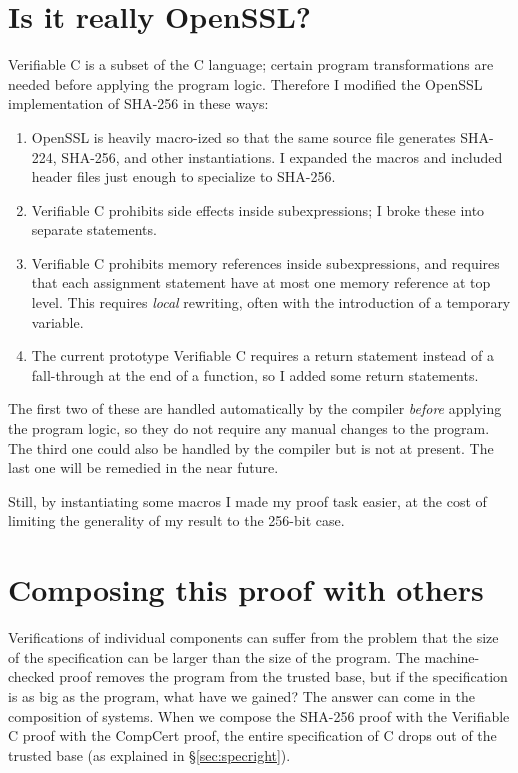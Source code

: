 \documentclass[prodmode,acmtoplas]{acmsmall}
\begin{document}
\section{Is it really OpenSSL?}
\label{sec:changes}
Verifiable C is a subset of the C language;
certain program transformations are needed before
applying the program logic.  Therefore I modified the
OpenSSL implementation of SHA-256 in these ways:

\begin{enumerate}
\item OpenSSL is heavily macro-ized so that the same
source file generates SHA-224, SHA-256, and other
instantiations.  I expanded the macros and included header
files just enough to specialize to SHA-256.
\item Verifiable C prohibits side effects inside subexpressions;
I broke these into separate statements.
\item Verifiable C
prohibits memory references inside subexpressions,
and
requires that each assignment statement have at most one memory reference
at top level.  This requires \emph{local} rewriting, often with
the introduction of a temporary variable.
\item The current prototype Verifiable C requires a return statement instead
of a fall-through at the end of a function, so I added some return statements.
\end{enumerate}
The first two of these are handled automatically by the compiler
\emph{before} applying the program logic, so they do not require
any manual changes to the program.  The third one could
also be handled by the compiler but is not at present.
The last one will be remedied in the near future.

Still, by instantiating some macros I made my proof task easier,
at the cost of limiting the generality of my result to the 256-bit case.

\section{Composing this proof with others}
\label{context}

Verifications of individual components can suffer from the
problem that the size of the specification can be larger than
the size of the program.  The machine-checked proof removes
the program from the trusted base, but if the specification
is as big as the program, what have we gained?
The answer can come in the composition of systems.
When we compose the SHA-256 proof with the Verifiable C
proof with the CompCert proof, the entire specification
of C drops out of the trusted base (as explained in \S\ref{sec:specright}).
\end{document}
